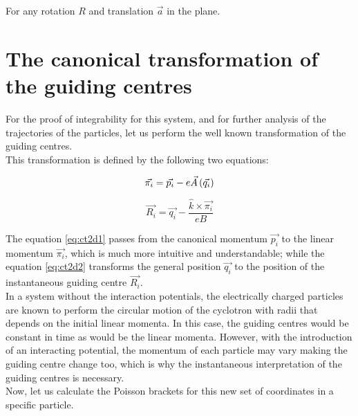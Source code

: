 For any rotation $R$ and translation $\vec{a}$ in the plane.\\

\section{The canonical transformation of the guiding centres}

For the proof of integrability for this system, and for further analysis of the trajectories of the particles, let us perform the well known transformation of the guiding centres.\\

This transformation is defined by the following two equations:

\begin{equation}
\vec{\pi_i} = \vec{p_i} - e\vec{A}\left( \vec{q_i} \right)
\label{eq:ct2d1}
\end{equation}

\begin{equation}
\vec{R_i} = \vec{q_i} - \frac{\hat{k}\times\vec{\pi_i}}{eB}
\label{eq:ct2d2}
\end{equation}

The equation \eqref{eq:ct2d1} passes from the canonical momentum $\vec{p_i}$ to the linear momentum $\vec{\pi_i}$, which is much more intuitive and understandable; while the equation \eqref{eq:ct2d2} transforms the general position  $\vec{q_i}$ to the position of the instantaneous guiding centre $\vec{R_i}$.\\

In a system without the interaction potentials, the electrically charged particles are known to perform the circular motion of the cyclotron with radii that depends on the initial linear momenta. In this case, the guiding centres would be constant in time as would be the linear momenta. However, with the introduction of an interacting potential, the momentum of each particle may vary making the guiding centre change too, which is why the instantaneous interpretation of the guiding centres is necessary.\\

Now, let us calculate the Poisson brackets for this new set of coordinates in a specific particle.


